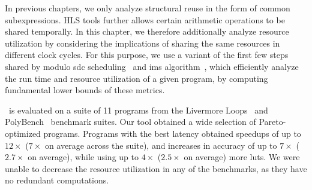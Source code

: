 In previous chapters, we only analyze structural reuse in the form of common
subexpressions.  HLS tools further allows certain arithmetic operations to be
shared temporally.  In this chapter, we therefore additionally analyze resource
utilization by considering the implications of sharing the same resources in
different clock cycles.  For this purpose, we use a variant of the first few
steps shared by modulo \gls{sdc} scheduling~\cite{canis14} and \acrfull{ims}
algorithm~\cite{rau94}, which efficiently analyze the run time and resource
utilization of a given program, by computing fundamental lower bounds of these
metrics.

\soap~is evaluated on a suite of 11 programs from the Livermore
Loops~\cite{livermore} and PolyBench~\cite{polybench} benchmark suites.  Our
tool obtained a wide selection of Pareto-optimized programs.  Programs with
the best latency obtained speedups of up to $12\times$ ($7\times$ on average
across the suite), and increases in accuracy of up to $7\times$ ($2.7\times$
on average), while using up to $4\times$ ($2.5\times$ on average) more
\glspl{lut}.  We were unable to decrease the resource utilization in any of the
benchmarks, as they have no redundant computations.

